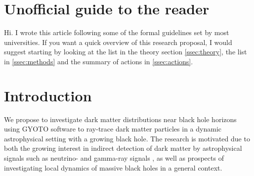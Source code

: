 \documentclass[12pt]{article}
\title{}
\author{}
\begin{document}
\maketitle


\begin{abstract}

\end{abstract}

\newpage

\tableofcontents

\newpage

\section*{Unofficial guide to the reader}

Hi. I wrote this article following some of the formal guidelines set by most universities. 
If you want a quick overview of this research proposal, I would suggest starting by looking at 
the list in the theory section \ref{ssec:theory}, the list in \ref{ssec:methods} and 
the summary of actions in \ref{ssec:actions}.


\section{Introduction}



We propose to investigate dark matter distributions near black hole horizons using GYOTO software to ray-trace dark matter 
particles in a dynamic astrophysical setting with a 
growing black hole. The 
research is motivated due to both the growing interest in indirect 
detection of dark matter by astrophysical signals such as 
neutrino- and gamma-ray signals 
\citep{2015_Arina_Silk}  %
, as well as prospects of investigating 
local dynamics of %
massive black holes in a general 
context. 
\end{document}
